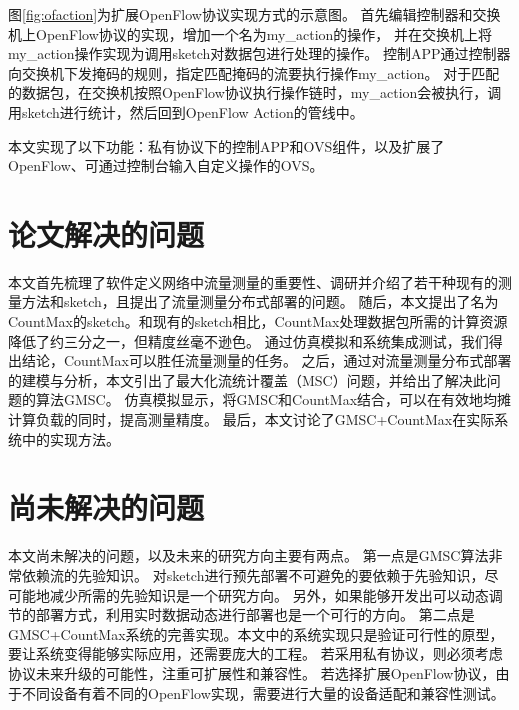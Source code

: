 图\ref{fig:ofaction}为扩展OpenFlow协议实现方式的示意图。
首先编辑控制器和交换机上OpenFlow协议的实现，增加一个名为my\_action的操作，
并在交换机上将my\_action操作实现为调用sketch对数据包进行处理的操作。
控制APP通过控制器向交换机下发掩码的规则，指定匹配掩码的流要执行操作my\_action。
对于匹配的数据包，在交换机按照OpenFlow协议执行操作链时，my\_action会被执行，调用sketch进行统计，然后回到OpenFlow Action的管线中。

本文实现了以下功能：私有协议下的控制APP和OVS组件，以及扩展了OpenFlow、可通过控制台输入自定义操作的OVS。

\section{论文解决的问题}
本文首先梳理了软件定义网络中流量测量的重要性、调研并介绍了若干种现有的测量方法和sketch，且提出了流量测量分布式部署的问题。
随后，本文提出了名为CountMax的sketch。和现有的sketch相比，CountMax处理数据包所需的计算资源降低了约三分之一，但精度丝毫不逊色。
通过仿真模拟和系统集成测试，我们得出结论，CountMax可以胜任流量测量的任务。
之后，通过对流量测量分布式部署的建模与分析，本文引出了最大化流统计覆盖（MSC）问题，并给出了解决此问题的算法GMSC。
仿真模拟显示，将GMSC和CountMax结合，可以在有效地均摊计算负载的同时，提高测量精度。
最后，本文讨论了GMSC+CountMax在实际系统中的实现方法。

\section{尚未解决的问题}
本文尚未解决的问题，以及未来的研究方向主要有两点。
第一点是GMSC算法非常依赖流的先验知识。
对sketch进行预先部署不可避免的要依赖于先验知识，尽可能地减少所需的先验知识是一个研究方向。
另外，如果能够开发出可以动态调节的部署方式，利用实时数据动态进行部署也是一个可行的方向。
第二点是GMSC+CountMax系统的完善实现。本文中的系统实现只是验证可行性的原型，要让系统变得能够实际应用，还需要庞大的工程。
若采用私有协议，则必须考虑协议未来升级的可能性，注重可扩展性和兼容性。
若选择扩展OpenFlow协议，由于不同设备有着不同的OpenFlow实现，需要进行大量的设备适配和兼容性测试。